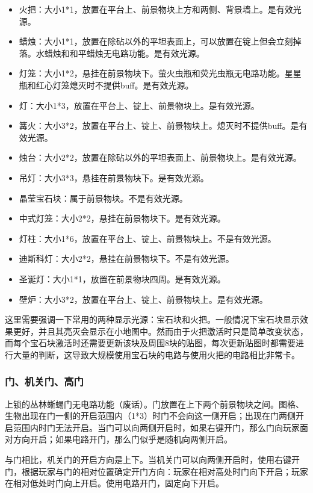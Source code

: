 \begin{itemize}
\item 火把：大小1*1，放置在平台上、前景物块上方和两侧、背景墙上。是有效光源。
\item 蜡烛：大小1*1，放置在除砧以外的平坦表面上，可以放置在锭上但会立刻掉落。水蜡烛和和平蜡烛无电路功能。是有效光源。
\item 灯笼：大小1*2，悬挂在前景物块下。萤火虫瓶和荧光虫瓶无电路功能。星星瓶和红心灯笼熄灭时不提供buff。是有效光源。
\item 灯：大小1*3，放置在平台上、锭上、前景物块上。是有效光源。
\item 篝火：大小3*2，放置在平台上、锭上、前景物块上。熄灭时不提供buff。是有效光源。
\item 烛台：大小2*2，放置在除砧以外的平坦表面上、前景物块上。是有效光源。
\item 吊灯：大小3*3，悬挂在前景物块下。是有效光源。
\item 晶莹宝石块：属于前景物块。不是有效光源。
\item 中式灯笼：大小2*2，悬挂在前景物块下。是有效光源。
\item 灯柱：大小1*6，放置在平台上、锭上、前景物块上。不是有效光源。
\item 迪斯科灯：大小2*2，悬挂在前景物块下。不是有效光源。
\item 圣诞灯：大小1*1，放置在前景物块四周。是有效光源。
\item 壁炉：大小3*2，放置在平台上、锭上、前景物块上。是有效光源。
\end{itemize}

这里需要强调一下常用的两种显示光源：宝石块和火把。一般情况下宝石块显示效果更好，并且其亮灭会显示在小地图中。然而由于火把激活时只是简单改变状态，而每个宝石块激活时还需要更新该块及周围8块的贴图，每次更新贴图时都需要进行大量的判断，这导致大规模使用宝石块的电路与使用火把的电路相比非常卡。

\subsubsection{门、机关门、高门}
上锁的丛林蜥蜴门无电路功能（废话）。门放置在上下两个前景物块之间。图格、生物出现在门一侧的开启范围内（1*3）时门不会向这一侧开启；出现在门两侧开启范围内时门无法开启。当门可以向两侧开启时，如果右键开门，那么门向玩家面对方向开启；如果电路开门，那么门似乎是随机向两侧开启。

与门相比，机关门的开启方向是上下。当机关门可以向两侧开启时，使用右键开门，根据玩家与门的相对位置确定开门方向：玩家在相对高处时门向下开启；玩家在相对低处时门向上开启。使用电路开门，固定向下开启。

